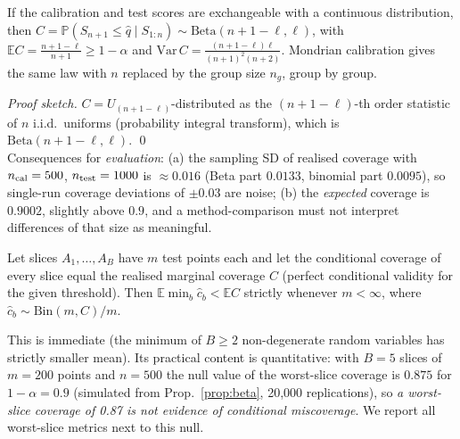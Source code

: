 \begin{proposition}\label{prop:beta}
If the calibration and test scores are exchangeable with a continuous distribution, then $C=\mathbb P(S_{n+1}\le\hat q\mid S_{1:n})\sim\mathrm{Beta}(n+1-\ell,\ell)$, with $\mathbb E C=\frac{n+1-\ell}{n+1}\ge1-\alpha$ and $\mathrm{Var}\,C=\frac{(n+1-\ell)\ell}{(n+1)^2(n+2)}$. Mondrian calibration gives the same law with $n$ replaced by the group size $n_g$, group by group.
\end{proposition}
\emph{Proof sketch.} $C=U_{(n+1-\ell)}$-distributed as the $(n+1-\ell)$-th order statistic of $n$ i.i.d.\ uniforms (probability integral transform), which is $\mathrm{Beta}(n+1-\ell,\ell)$. \qed\\
Consequences for \emph{evaluation}: (a) the sampling SD of realised coverage with $n_{\rm cal}=500$, $n_{\rm test}=1000$ is $\approx0.016$ (Beta part $0.0133$, binomial part $0.0095$), so single-run coverage deviations of $\pm 0.03$ are noise; (b) the \emph{expected} coverage is $0.9002$, slightly above $0.9$, and a method-comparison must not interpret differences of that size as meaningful.

\begin{proposition}\label{prop:null}
Let slices $A_1,\dots,A_B$ have $m$ test points each and let the conditional coverage of every slice equal the realised marginal coverage $C$ (perfect conditional validity for the given threshold). Then $\mathbb E\min_b \hat c_b<\mathbb E C$ strictly whenever $m<\infty$, where $\hat c_b\sim\mathrm{Bin}(m,C)/m$.
\end{proposition}
This is immediate (the minimum of $B\ge2$ non-degenerate random variables has strictly smaller mean). Its practical content is quantitative: with $B=5$ slices of $m=200$ points and $n=500$ the null value of the worst-slice coverage is $0.875$ for $1-\alpha=0.9$ (simulated from Prop.~\ref{prop:beta}, 20{,}000 replications), so \emph{a worst-slice coverage of 0.87 is not evidence of conditional miscoverage}. We report all worst-slice metrics next to this null.

